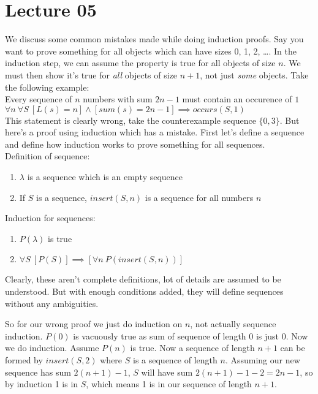 \documentclass[a4paper,10pt]{article}
\theoremstyle{definition} %
\begin{document}
    \section{Lecture 05}
    We discuss some common mistakes made while doing induction proofs. Say you want
    to prove something for all objects which can have sizes 0, 1, 2, \dots.
    In the induction step, we can assume the property is true for all objects of size $n$.
    We must then show it's true for \emph{all} objects of size $n+1$, not just \emph{some}
    objects. Take the following example: \\
    Every sequence of $n$ numbers with sum $2n-1$ must contain an occurence of $1$ \\
    $\forall n \ \forall S \ [L(s) = n] \land [sum(s) = 2n-1] \implies occurs(S,1)$ \\
    This statement is clearly wrong, take the counterexample sequence $\{0, 3\}$. But
    here's a proof using induction which has a mistake. First let's define a sequence
    and define how induction works to prove something for all sequences. \\
    Definition of sequence:
    \begin{enumerate}
        \item $\lambda$ is a sequence which is an empty sequence
        \item If $S$ is a sequence, $insert(S,n)$ is a sequence for all numbers $n$
    \end{enumerate}
    Induction for sequences:
    \begin{enumerate}
        \item $P(\lambda)$ is true
        \item $\forall S \ [P(S)] \implies [\forall n \ P(insert(S, n))]$ 
    \end{enumerate}

    Clearly, these aren't complete definitions, lot of details are assumed to be understood.
    But with enough conditions added, they will define sequences without any ambiguities. 
    
    So for our wrong proof we just do induction on $n$, not actually sequence induction.
    $P(0)$ is vacuously true as sum of sequence of length 0 is just 0. Now we do induction.
    Assume $P(n)$ is true. Now a sequence of length $n+1$ can be formed by $insert(S, 2)$
    where $S$ is a sequence of length $n$. Assuming our new sequence has sum $2(n+1)-1$, 
    $S$ will have sum $2(n+1)-1 - 2 = 2n-1$, so by induction 1 is in $S$, which means
    1 is in our sequence of length $n+1$.
\end{document}
